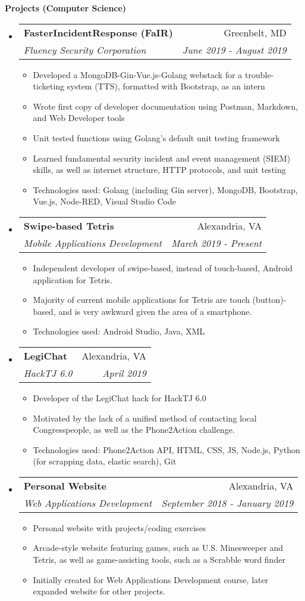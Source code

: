 \documentclass[letterpaper,11pt]{article}
\makeatletter
\newcommand{\resitem}[1]{\item #1 \vspace{-2pt}}
\newcommand{\resheading}[1]{{\large \colorbox{mygrey}{\begin{minipage}{\textwidth}{\textbf{#1 \vphantom{p\^{E}}}}\end{minipage}}}}
\newcommand{\ressubheading}[4]{
\begin{tabular*}{7.0in}{l@{\extracolsep{\fill}}r}
		\textbf{#1} & #2 \\
		\textit{#3} & \textit{#4} \\
\end{tabular*}\vspace{-6pt}}
\makeatother
\begin{document}
\resheading{Projects (Computer Science)}

\begin{itemize}
\item
    \ressubheading{FasterIncidentResponse (FaIR)}{Greenbelt, MD}{Fluency Security Corporation}{June 2019 - August 2019}
	\begin{itemize}
		\resitem{Developed a MongoDB-Gin-Vue.js-Golang webstack for a trouble-ticketing system (TTS), formatted with Bootstrap, as an intern}
		\resitem{Wrote first copy of developer documentation using Postman, Markdown, and Web Developer tools}
		\resitem{Unit tested functions using Golang's default unit testing framework}
		\resitem{Learned fundamental security incident and event management (SIEM) skills, as well as internet structure, HTTP protocols, and unit testing}
		\resitem{Technologies used: Golang (including Gin server), MongoDB, Bootstrap, Vue.js, Node-RED, Visual Studio Code}
	\end{itemize}
\item
    \ressubheading{Swipe-based Tetris}{Alexandria, VA}{Mobile Applications Development}{March 2019 - Present}
	\begin{itemize}
		\resitem{Independent developer of swipe-based, instead of touch-based, Android application for Tetris.}
		\resitem{Majority of current mobile applications for Tetris are touch (button)-based, and is very awkward given the area of a smartphone.}
		\resitem{Technologies used: Android Studio, Java, XML}
	\end{itemize}
\item
    \ressubheading{LegiChat}{Alexandria, VA}{HackTJ 6.0}{April 2019}
	\begin{itemize}
		\resitem{Developer of the LegiChat hack for HackTJ 6.0}
		\resitem{Motivated by the lack of a unified method of contacting local Congresspeople, as well as the Phone2Action challenge.}
		\resitem{Technologies used: Phone2Action API, HTML, CSS, JS, Node.js, Python (for scrapping data, elastic search), Git}
	\end{itemize}
\item
    \ressubheading{Personal Website}{Alexandria, VA}{Web Applications Development}{September 2018 - January 2019}
	\begin{itemize}
		\resitem{Personal website with projects/coding exercises}
		\resitem{Arcade-style website featuring games, such as U.S. Minesweeper and Tetris, as well as game-assisting tools, such as a Scrabble word finder}
		\resitem{Initially created for Web Applications Development course, later expanded website for other projects.}

\end{itemize}
\end{itemize}
\end{document}
